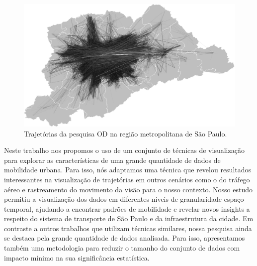 \begin{figure}[!htb]
  \centering
  \includegraphics[width=150mm]{../figuras/unbundled-edges+grayscale+512px.png}
  \caption[Trajetórias da pesquisa OD na região metropolitana de S\~ao Paulo]{Trajetórias da pesquisa
OD na região metropolitana de S\~ao Paulo. \label{fig:cluttered-graph}}
  
\end{figure}

Neste trabalho nos propomos o uso de um conjunto de técnicas de visualização
para explorar as características de uma grande quantidade de dados de
mobilidade urbana. Para isso, nós adaptamos uma técnica que revelou resultados
interessantes na visualização de trajetórias em outros cenários como o do
tráfego aéreo e rastreamento do movimento da visão para o nosso contexto.
Nosso estudo permitiu a visualização dos dados em diferentes níveis de
granularidade espaço temporal, ajudando a encontrar padrões de mobilidade e
revelar novos insights a respeito do sistema de transporte de S\~ao Paulo e da
infraestrutura da cidade. Em contraste a outros trabalhos que utilizam técnicas
similares, nossa pesquisa ainda se destaca pela grande quantidade de dados
analisada. Para isso, apresentamos também uma metodologia para reduzir o tamanho
do conjunto de dados com impacto mínimo na sua significância estatística. 

